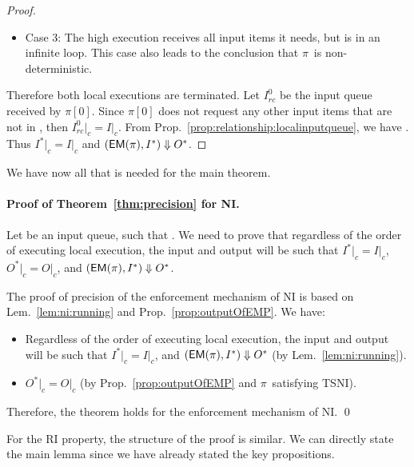 \documentclass[10pt,a4paper,oneside]{article}
\def\execution#1#2#3{\ensuremath{(#1, #2)\Downarrow#3}}
\def\Irc#1{\ensuremath{I_{rc}^{#1}}}
\def\channeleq#1#2#3{\ensuremath{\restrict{#1}{#3} = \restrict{#2}{#3}}}
\def\restrict#1#2{\ensuremath{{#1}|_{#2}}}
\def\chnl{\ensuremath{c}}
\def\sanserif#1{\ensuremath{\sf #1}}
\def\EM{\ensuremath{{\sanserif{EM}}}}
\def\Prog{\ensuremath{\pi}}
\def\Progl#1{\ensuremath{\Prog[#1]}}
\def\EMP{\ensuremath{\EM(}\ensuremath{\Prog)}}
\begin{document}
\begin{proof}
\begin{itemize}
    \item Case 3: The high execution receives all input items it needs, but is in an infinite loop. This case also leads to the conclusion that \Prog\ is non-deterministic.
\end{itemize}

Therefore both local executions are terminated. Let \Irc{0} be the input queue received by \Progl{0}. Since \Progl{0} does not request any other input items that are not in , then \channeleq{\Irc{0}}{I}{\chnl}. From Prop.~\ref{prop:relationship:localinputqueue}, we have . Thus \channeleq{I^*}{I}{\chnl} and \execution{\EMP}{I^*}{O^*}.



\end{proof}

We have now all that is needed for the main theorem.

\paragraph{Proof of Theorem~\ref{thm:precision} for NI.}
Let  be an input queue, such that . We need to prove that regardless of the order of executing local execution, the input  and output  will be such that \channeleq{I^*}{I}{\chnl}, \channeleq{O^*}{O}{\chnl}, and \execution{\EMP}{I^*}{O^*}.



The proof of precision of the enforcement mechanism of NI is based on Lem.~\ref{lem:ni:running} and Prop.~\ref{prop:outputOfEMP}. We have:
\begin{itemize}
\item Regardless of the order of executing local execution, the input  and output  will be such that \channeleq{I^*}{I}{\chnl}, and \execution{\EMP}{I^*}{O^*} (by Lem.~\ref{lem:ni:running}).
\item \channeleq{O^*}{O}{\chnl} (by Prop.~\ref{prop:outputOfEMP} and \Prog\ satisfying TSNI).
\end{itemize}

Therefore, the theorem holds for the enforcement mechanism of NI. \qed

For the RI property, the structure of the proof is similar. We can directly state the main lemma since we have already stated the key propositions.
\end{document}
